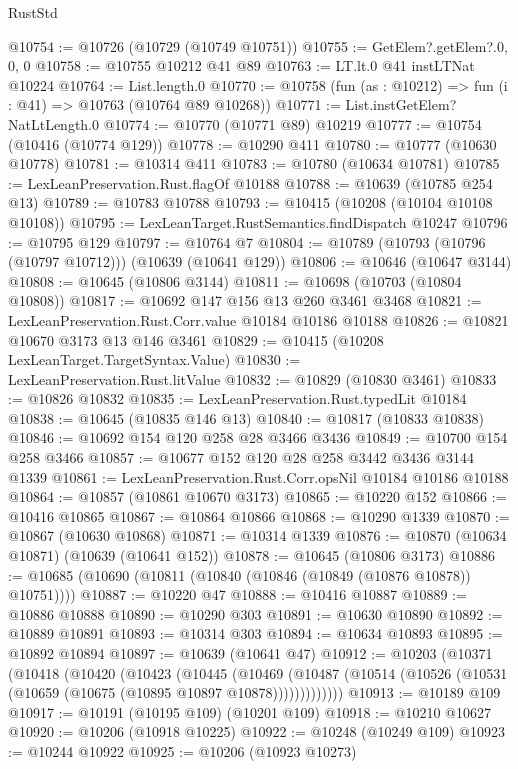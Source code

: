 \begin{lexlean}{RustStd}
\begin{coremodule}
@10754 := @10726 (@10729 (@10749 @10751))
@10755 := GetElem?.getElem?.{0, 0, 0}
@10758 := @10755 @10212 @41 @89
@10763 := LT.lt.{0} @41 instLTNat @10224
@10764 := List.length.{0}
@10770 := @10758 (fun (as : @10212) => fun (i : @41) => @10763 (@10764 @89 @10268))
@10771 := List.instGetElem?NatLtLength.{0}
@10774 := @10770 (@10771 @89) @10219
@10777 := @10754 (@10416 (@10774 @129))
@10778 := @10290 @411
@10780 := @10777 (@10630 @10778)
@10781 := @10314 @411
@10783 := @10780 (@10634 @10781)
@10785 := LexLeanPreservation.Rust.flagOf @10188
@10788 := @10639 (@10785 @254 @13)
@10789 := @10783 @10788
@10793 := @10415 (@10208 (@10104 @10108 @10108))
@10795 := LexLeanTarget.RustSemantics.findDispatch @10247
@10796 := @10795 @129
@10797 := @10764 @7
@10804 := @10789 (@10793 (@10796 (@10797 @10712))) (@10639 (@10641 @129))
@10806 := @10646 (@10647 @3144)
@10808 := @10645 (@10806 @3144)
@10811 := @10698 (@10703 (@10804 @10808))
@10817 := @10692 @147 @156 @13 @260 @3461 @3468
@10821 := LexLeanPreservation.Rust.Corr.value @10184 @10186 @10188
@10826 := @10821 @10670 @3173 @13 @146 @3461
@10829 := @10415 (@10208 LexLeanTarget.TargetSyntax.Value)
@10830 := LexLeanPreservation.Rust.litValue
@10832 := @10829 (@10830 @3461)
@10833 := @10826 @10832
@10835 := LexLeanPreservation.Rust.typedLit @10184
@10838 := @10645 (@10835 @146 @13)
@10840 := @10817 (@10833 @10838)
@10846 := @10692 @154 @120 @258 @28 @3466 @3436
@10849 := @10700 @154 @258 @3466
@10857 := @10677 @152 @120 @28 @258 @3442 @3436 @3144 @1339
@10861 := LexLeanPreservation.Rust.Corr.opsNil @10184 @10186 @10188
@10864 := @10857 (@10861 @10670 @3173)
@10865 := @10220 @152
@10866 := @10416 @10865
@10867 := @10864 @10866
@10868 := @10290 @1339
@10870 := @10867 (@10630 @10868)
@10871 := @10314 @1339
@10876 := @10870 (@10634 @10871) (@10639 (@10641 @152))
@10878 := @10645 (@10806 @3173)
@10886 := @10685 (@10690 (@10811 (@10840 (@10846 (@10849 (@10876 @10878)) @10751))))
@10887 := @10220 @47
@10888 := @10416 @10887
@10889 := @10886 @10888
@10890 := @10290 @303
@10891 := @10630 @10890
@10892 := @10889 @10891
@10893 := @10314 @303
@10894 := @10634 @10893
@10895 := @10892 @10894
@10897 := @10639 (@10641 @47)
@10912 := @10203
    (@10371
      (@10418
        (@10420
          (@10423
            (@10445
              (@10469
                (@10487 (@10514 (@10526 (@10531 (@10659 (@10675 (@10895 @10897 @10878)))))))))))))
@10913 := @10189 @109
@10917 := @10191 (@10195 @109) (@10201 @109)
@10918 := @10210 @10627
@10920 := @10206 (@10918 @10225)
@10922 := @10248 (@10249 @109)
@10923 := @10244 @10922
@10925 := @10206 (@10923 @10273)

\end{coremodule}
\end{lexlean}
